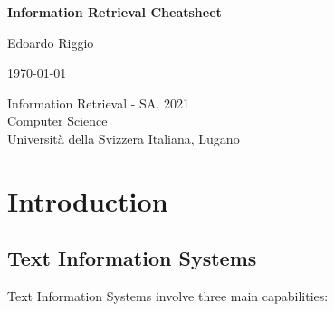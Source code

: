 \documentclass{article}
\begin{document}
\begin{titlepage}
    \begin{center}
        \vspace*{1cm}
        
        \Huge
        \textbf{Information Retrieval Cheatsheet}
        
        \vspace{0.5cm}
        \LARGE
        
        \vspace{.5cm}
        
        Edoardo Riggio
   		  \vspace{1.5cm}
       
        \vfill
        
        \today
        
        \vspace{.8cm}
          \Large
          Information Retrieval - SA. 2021 \\
        Computer Science\\
        Universit\`{a} della Svizzera Italiana, Lugano\\
        
    \end{center}
\end{titlepage}

\tableofcontents

\newpage

\section{Introduction}
\subsection{Text Information Systems}
Text Information Systems involve three main capabilities:
\end{document}
